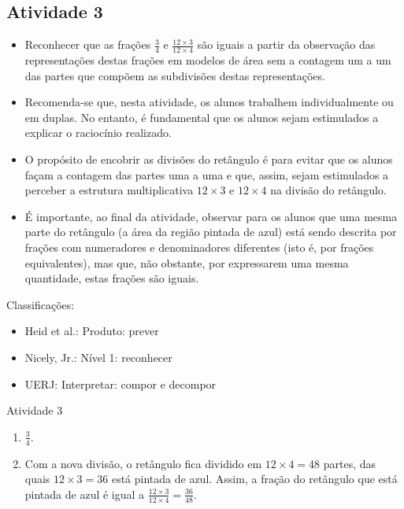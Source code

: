 \begin{multicols}{2}
\subsection{Atividade 3}


\begin{itemize} %
    \item       Reconhecer que as frações       $\frac{3}{4}$       e       
$\frac{12 \times 3}{12 \times 4}$       são iguais a partir da observação das 
representações destas frações em modelos de área sem a contagem um a um das 
partes que compõem as subdivisões destas representações.
\end{itemize} %
  
  
 
\begin{itemize} %
    \item       Recomenda-se que, nesta atividade, os alunos trabalhem 
individualmente ou em duplas. No entanto, é fundamental que os alunos sejam 
estimulados a explicar o raciocínio realizado.
    \item       O propósito de encobrir as divisões do retângulo é para evitar 
que os alunos façam a contagem das partes uma a uma e que, assim, sejam 
estimulados a perceber a estrutura multiplicativa       $12 \times 3$       e    
   $12 \times 4$       na divisão do retângulo.
    \item       É importante, ao final da atividade, observar para os alunos que 
uma mesma parte do retângulo (a área da região pintada de azul) está sendo 
descrita por frações com numeradores e denominadores diferentes (isto é, por 
frações equivalentes), mas que, não obstante, por expressarem uma mesma 
quantidade, estas frações são iguais. 
\end{itemize} %
  
  
  Classificações:  
\begin{itemize} %
    \item       Heid et al.: Produto: prever
    \item       Nicely, Jr.: Nível 1: reconhecer
    \item       UERJ: Interpretar: compor e decompor
\end{itemize} %
  
\begin{resposta*}{Atividade 3}  
\begin{enumerate} [\quad a)] %
    \item             $\frac{3}{4}$.
    \item       Com a nova divisão, o retângulo fica dividido em       $12 
\times 4 = 48$       partes, das quais       $12 \times 3 = 36$       está 
pintada de azul. Assim, a fração do retângulo que está pintada de azul é igual a 
      $\frac{12 \times 3}{12 \times 4} = \frac{36}{48}$.
\end{enumerate} %
  

\end{resposta*}
\end{multicols}
